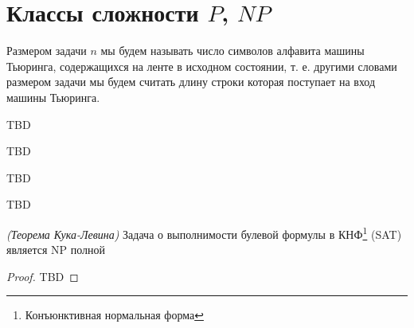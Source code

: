 \section{Классы сложности $P$, $NP$}

\begin{definition}
Размером задачи $n$ мы будем называть число символов алфавита машины
Тьюринга, содержащихся на ленте в исходном состоянии, т. е. другими
словами размером задачи мы будем считать длину строки которая
поступает на вход машины Тьюринга.
\end{definition}

\begin{definition}[Класс $P$]
TBD
\end{definition}

\begin{definition}[Класс $NP$]
TBD
\end{definition}

\begin{definition}
TBD
\end{definition}


TBD

\begin{theorem}
\emph{(Теорема Кука-Левина)}
Задача о выполнимости булевой формулы в КНФ\footnote{Конъюнктивная нормальная форма} (SAT) является NP полной
\label{theoremAddAlgoCookTheorem}
\end{theorem}

\begin{proof}
TBD
\end{proof}
